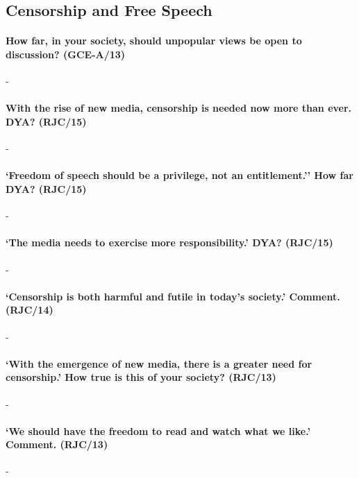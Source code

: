 \documentclass[../../main]{subfiles}
\begin{document}
\subsection{Censorship and Free Speech}

\paragraph{How far, in your society, should unpopular views be open to discussion? (GCE-A/13)}-

\paragraph{With the rise of new media, censorship is needed now more than ever. DYA? (RJC/15)}-

\paragraph{`Freedom of speech should be a privilege, not an entitlement.'' How far DYA? (RJC/15)}-

\paragraph{`The media needs to exercise more responsibility.' DYA? (RJC/15)}-

\paragraph{`Censorship is both harmful and futile in today's society.' Comment. (RJC/14)}-

\paragraph{`With the emergence of new media, there is a greater need for censorship.' How true is this of your society? (RJC/13)}-

\paragraph{`We should have the freedom to read and watch what we like.' Comment. (RJC/13)}-
\end{document}
